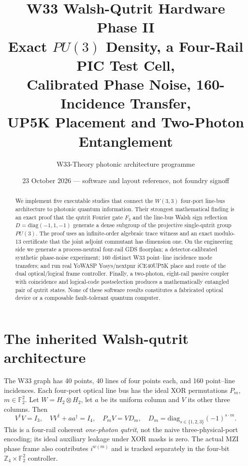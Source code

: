 \documentclass[10pt]{article}
\title{\textbf{W33 Walsh-Qutrit Hardware Phase II}\\
Exact $PU(3)$ Density, a Four-Rail PIC Test Cell,\\
Calibrated Phase Noise, 160-Incidence Transfer,\\
UP5K Placement and Two-Photon Entanglement}
\author{W33-Theory photonic architecture programme}
\date{23 October 2026 --- software and layout reference, not foundry signoff}
\begin{document}
\maketitle
\begin{abstract}
We implement five executable studies that connect the $W(3,3)$ four-port
line-bus architecture to photonic quantum information. Their strongest
mathematical finding is an exact proof that the qutrit Fourier gate
$F_3$ and the line-bus Walsh sign reflection $D=\mathrm{diag}(-1,1,-1)$
generate a dense subgroup of the projective single-qutrit group $PU(3)$.
The proof uses an infinite-order algebraic trace witness and an exact
modulo-13 certificate that the joint adjoint commutant has dimension one.
On the engineering side we generate a process-neutral four-rail GDS
floorplan; a detector-calibrated synthetic phase-noise experiment;
160 distinct W33 point--line incidence mode transfers; and run
real YoWASP Yosys/nextpnr iCE40UP5K place and route of the dual
optical/logical frame controller.
Finally, a two-photon, eight-rail passive coupler with coincidence
and logical-code postselection produces a mathematically entangled
pair of qutrit states. None of these software results constitutes a
fabricated optical device or a composable fault-tolerant quantum computer.
\end{abstract}
\tableofcontents

\section{The inherited Walsh-qutrit architecture}
The W33 graph has 40 points, 40 lines of four points each, and
160 point--line incidences. Each four-port optical line bus has
the ideal XOR permutations $P_m$, $m\in\mathbb F_2^2$.
Let $W=H_2\otimes H_2$, let $a$ be its uniform
column and $V$ its other three columns. Then
\[
V^\dagger V=I_3,\quad VV^\dagger+aa^\dagger=I_4,\quad
P_mV=VD_m,\quad
D_m=\mathrm{diag}_{s\in\{1,2,3\}}(-1)^{s\cdot m}.
\]
This is a four-rail coherent \emph{one-photon qutrit}, not
the naive three-physical-port encoding; its ideal auxiliary
leakage under XOR masks is zero. The actual MZI phase frame
also contributes $i^{w(m)}$ and is tracked separately in
the four-bit $\mathbb Z_4\times\mathbb F_2^2$ controller.
\end{document}
